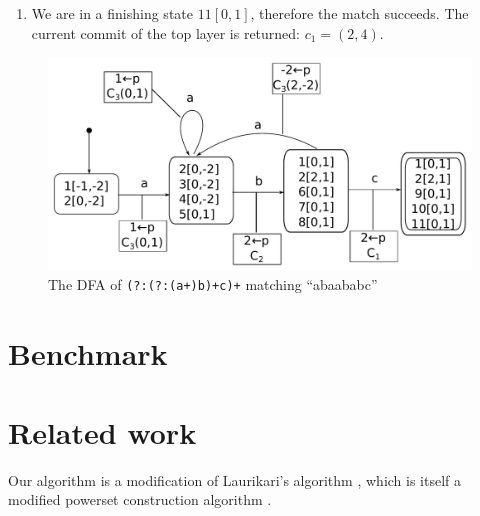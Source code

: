 \documentclass[english]{sigplanconf}
\begin{document}
\begin{enumerate}
\begin{enumerate}
\item We are in a finishing state $11[0,1]$, therefore the match succeeds.
The current commit of the top layer is returned: $c_{1}=(2,4)$.
\end{enumerate}
\end{enumerate}
\begin{figure}
\includegraphics[width=\linewidth]{graphs/abc-dfa}

\caption{\label{fig:lazy-dfa}The DFA of \texttt{(?:(?:(a+)b)+c)+} matching
``abaababc''}


\end{figure}

\section{Benchmark}


\section{Related work}
Our algorithm is a modification of Laurikari's algorithm \cite{laurikari2000nfas},
which is itself a modified powerset construction algorithm \cite[p. 55]{Sipser2005}.
\end{document}
